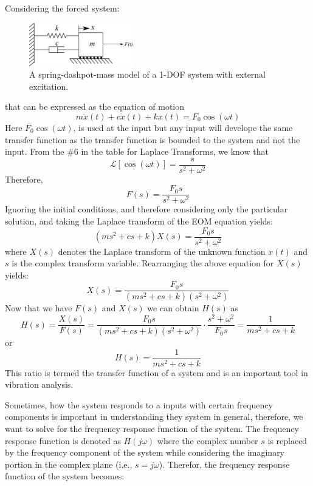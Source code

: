\documentclass[12pt,letter]{article}
\numberwithin{ex}{section} %
\numberwithin{re}{section} %
\newcommand{\Laplace}[1]{\ensuremath{\mathcal{L}{\left[#1\right]}}}
\begin{document}
Considering the forced system:
\begin{figure}[H]
	\centering
	\includegraphics[width=0.4\textwidth]{../Figures/forced_spring_mass_damper_system.png}
	\caption{A spring-dashpot-mass model of a 1-DOF system with external excitation.}
\end{figure}
\noindent that can be expressed as the equation of motion
\begin{equation}
	m\ddot{x}(t) + c\dot{x}(t) +kx(t) = F_0 \cos(\omega t)
\end{equation}
Here $F_0 \cos(\omega t)$, is used at the input but any input will develope the same transfer function as the transfer function is bounded to the system and not the input. From the \#6 in the table for Laplace Transforms, we know that
\begin{equation}
	\Laplace{\cos(\omega t)} = \frac{s}{s^2+\omega^2}
\end{equation}
Therefore, 
\begin{equation}
F(s) = \frac{F_0s}{s^2+\omega^2}
\end{equation}
Ignoring the initial conditions, and therefore considering only the particular solution, and taking the Laplace transform of the EOM equation yields:
\begin{equation}
(ms^2 + cs +k)X(s) = \frac{F_0s}{s^2+\omega^2} 
\end{equation}
where $X(s)$ denotes the Laplace transform of the unknown function $x(t)$ and $s$ is the complex transform variable. Rearranging the above equation for $X(s)$ yields: 
\begin{equation}
X(s) = \frac{F_0s}{(ms^2 + cs +k)(s^2+\omega^2)}
\end{equation}
Now that we have $F(s)$ and $X(s)$ we can obtain $H(s)$ as  
\begin{equation}
H(s) = \frac{X(s)}{F(s)} = \frac{F_0s}{(ms^2 + cs +k)(s^2+\omega^2)} \cdot \frac{s^2+\omega^2}{F_0s} = \frac{1}{ms^2+cs+k}
\end{equation}
or 
\begin{equation}
H(s) = \frac{1}{ms^2+cs+k}
\end{equation}
This ratio is termed the transfer function of a system and is an important tool in vibration analysis.

Sometimes, how the system responds to a inputs with certain frequency components is important in understanding they system in general, therefore, we want to solve for the frequency response function of the system. The frequency response function is denoted as $H(j\omega)$ where the complex number $s$ is replaced by the frequency component of the system while considering the imaginary portion in the complex plane (i.e., $s = j\omega$). Therefor, the frequency response function of the system becomes:
\end{document}
